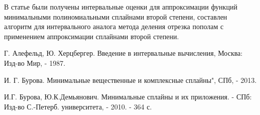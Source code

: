 \documentclass{spisok-article}
\begin{document}
В статье были получены интервальные оценки для аппроксимации функций минимальными полиномиальными сплайнами второй степени, составлен алгоритм для интервального аналога метода деления отрезка пополам с применением аппроксимации сплайнами второй степени.

\makeatletter\renewcommand{\refname}{\intl@references}\makeatother
\begin{thebibliography}{8}

 	Г. Алефельд, Ю. Херцбергер. Введение в интервальные вычисления,
 Москва: Изд-во Мир, - 1987.

	И. Г. Бурова. Минимальные вещественные и комплексные сплайны", СПб, - 2013.

 И.Г. Бурова, Ю.К.Демьянович.  Минимальные сплайны и их приложения.
 - СПб: Изд-во С.-Петерб. университета, - 2010. - 364 с.
\end{thebibliography}
\end{document}
